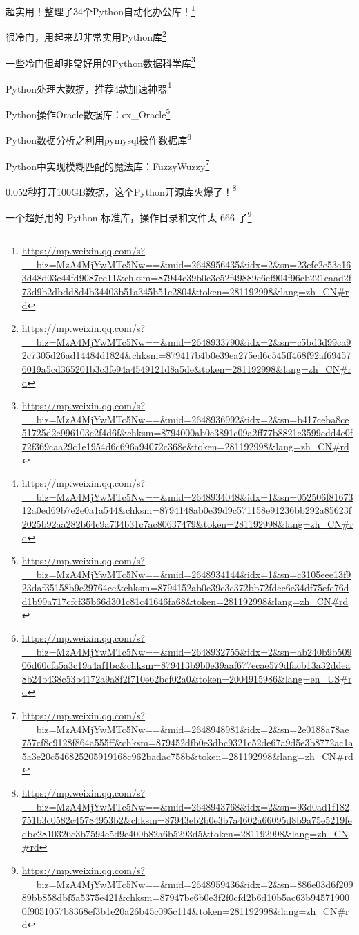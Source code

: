 \documentclass[]{ctexbook}
\renewcommand{\href}[2]{#2\footnote{\url{#1}}}
\begin{document}
\href{https://mp.weixin.qq.com/s?__biz=MzA4MjYwMTc5Nw==\&mid=2648956435\&idx=2\&sn=23efe2e53e163d48d03c44fd9087ee11\&chksm=87944c39b0e3c52f49889e6ef904f96cb221eaad2f73d9b2dbdd8d4b34403b51a345b51c2804\&token=281192998\&lang=zh_CN\#rd}{超实用！整理了34个Python自动化办公库！}

\href{https://mp.weixin.qq.com/s?__biz=MzA4MjYwMTc5Nw==\&mid=2648933790\&idx=2\&sn=c5bd3d99ca92c7305d26ad14484d1824\&chksm=879417b4b0e39ea275ed6c545ff468f92af694576019a5cd365201b3c3fe94a4549121d8a5de\&token=281192998\&lang=zh_CN\#rd}{很冷门，用起来却非常实用Python库}

\href{https://mp.weixin.qq.com/s?__biz=MzA4MjYwMTc5Nw==\&mid=2648936992\&idx=2\&sn=b417ceba8ce51725d2e996103c2f4d6f\&chksm=8794000ab0e3891c09a2ff77b8821e3599cdd4c0f72f369caa29c1e1954d6c696a94072c368e\&token=281192998\&lang=zh_CN\#rd}{一些冷门但却非常好用的Python数据科学库}

\href{https://mp.weixin.qq.com/s?__biz=MzA4MjYwMTc5Nw==\&mid=2648934048\&idx=1\&sn=052506f8167312a0ed69b7e2e0a1a544\&chksm=8794148ab0e39d9c571158e91236bb292a85623f2025b92aa282b64c9a734b31c7ac80637479\&token=281192998\&lang=zh_CN\#rd}{Python处理大数据，推荐4款加速神器}

\href{https://mp.weixin.qq.com/s?__biz=MzA4MjYwMTc5Nw==\&mid=2648934144\&idx=1\&sn=c3105eee13f923daf35158b9e29764ce\&chksm=8794152ab0e39c3c372bb72fdec6e34df75efe76dd1b99a717cfcf35b66d301c81c41646fa68\&token=281192998\&lang=zh_CN\#rd}{Python操作Oracle数据库：cx\_Oracle}

\href{https://mp.weixin.qq.com/s?__biz=MzA4MjYwMTc5Nw==\&mid=2648932755\&idx=2\&sn=ab240b9b50906d60cfa5a3c19a4af1bc\&chksm=879413b9b0e39aaf677ecae579dfacb13a32ddea8b24b438c53b4172a9a8f2f710e62bcf02a0\&token=2004915986\&lang=en_US\#rd}{Python数据分析之利用pymysql操作数据库}

\href{https://mp.weixin.qq.com/s?__biz=MzA4MjYwMTc5Nw==\&mid=2648948981\&idx=2\&sn=2e0188a78ae757cf8c9128f864a555ff\&chksm=879452dfb0e3dbc9321c52de67a9d5e3b8772ac1a5a3e20c546825205919168c962badac758b\&token=281192998\&lang=zh_CN\#rd}{Python中实现模糊匹配的魔法库：FuzzyWuzzy}

\href{https://mp.weixin.qq.com/s?__biz=MzA4MjYwMTc5Nw==\&mid=2648943768\&idx=2\&sn=93d0ad1f182751b3c0582c45784953b2\&chksm=87943eb2b0e3b7a4602a66095d8b9a75e5219fedbc2810326c3b7594e5d9e400b82a6b5293d5\&token=281192998\&lang=zh_CN\#rd}{0.052秒打开100GB数据，这个Python开源库火爆了！}

\href{https://mp.weixin.qq.com/s?__biz=MzA4MjYwMTc5Nw==\&mid=2648959436\&idx=2\&sn=886e03d6f20989bb858dbf5a5375e421\&chksm=87947be6b0e3f2f0cfd2b6d10b5ac63b945719000f9051057b8368ef3b1e20a26b45c095c114\&token=281192998\&lang=zh_CN\#rd}{一个超好用的 Python 标准库，操作目录和文件太 666 了}
\end{document}

